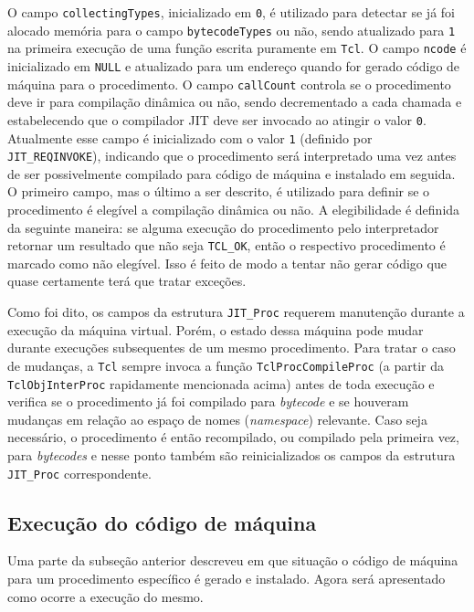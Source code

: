O campo \verb!collectingTypes!, inicializado em \verb!0!, é utilizado para
detectar se já foi alocado memória para o campo \verb!bytecodeTypes!
ou não, sendo atualizado para \verb!1! na primeira execução de uma
função escrita puramente em \texttt{Tcl}. O campo \verb!ncode! é
inicializado em \verb!NULL! e atualizado para um endereço quando for
gerado código de máquina para o procedimento. O campo \verb!callCount!
controla se o procedimento deve ir para compilação dinâmica ou não,
sendo decrementado a cada chamada e estabelecendo que o compilador JIT
deve ser invocado ao atingir
o valor \verb!0!. Atualmente esse campo é inicializado com o valor
\verb!1! (definido por \verb!JIT_REQINVOKE!),
indicando que o procedimento será interpretado uma vez antes
de ser possivelmente compilado para código de máquina e instalado em
seguida. O primeiro
campo, mas o último a ser descrito, é utilizado para definir se o
procedimento é elegível a compilação dinâmica ou não. A elegibilidade
é definida da seguinte maneira: se alguma execução do procedimento pelo
interpretador retornar um resultado que não seja \verb!TCL_OK!, então
o respectivo procedimento é marcado como não elegível. Isso é feito de
modo a tentar não gerar código que quase certamente terá que
tratar exceções.

Como foi dito, os campos da estrutura \verb!JIT_Proc! requerem
manutenção durante a execução da máquina virtual. Porém, o estado dessa
máquina pode mudar durante execuções subsequentes de um mesmo
procedimento. Para tratar o caso de mudanças, a \texttt{Tcl} sempre invoca a
função \verb!TclProcCompileProc! (a partir da \verb!TclObjInterProc!
rapidamente mencionada acima) antes de toda execução e verifica se o
procedimento já foi compilado para \textit{bytecode} e se houveram
mudanças em relação ao espaço de nomes (\textit{namespace})
relevante. Caso seja necessário, o procedimento é então recompilado,
ou compilado pela primeira vez, para \textit{bytecodes} e nesse ponto
também são reinicializados os campos da estrutura \verb!JIT_Proc!
correspondente.


\subsection{Execução do código de máquina}
\label{codeexec}
Uma parte da subseção anterior descreveu em que situação o código de
máquina para um procedimento específico é gerado e instalado. Agora será
apresentado como ocorre a execução do mesmo.

